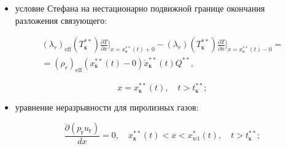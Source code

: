 \begin{itemize}
связующего:

\begin{gather}

\label{kuzn11:eq15}

(\lambda_r)_\text{eff} (T_\text{н}^{\ast \ast})  \frac{\partial T}{\partial x} \Bigr|_{x=x_\text{н}^{\ast \ast} (t)+0} {-}(\lambda_r)_\text{eff} (T_\text{н}^{\ast \ast} ) \frac{\partial T}{\partial x} \Bigr|_{x=x_\text{н}^{\ast \ast} (t)-0} =\rho_r \dot {x}_\text{н}^{\ast \ast} (t)Q^{\ast \ast},\\

\notag

x=x_\text{н}^{\ast \ast} (t),\quad t>t_\text{н}^{\ast \ast};

\end{gather}



\item 

условие Стефана на нестационарно подвижной границе окончания разложения связующего:

\begin{multline}

\label{kuzn11:eq16}

(\lambda _r)_\text{eff} (T_\text{к}^{\ast \ast} ) \frac{\partial T}{\partial x} \Bigr|_{x=x_\text{к}^{\ast \ast} (t)+0} - 

(\lambda _r)(T_\text{к}^{\ast \ast} ) \frac{\partial T}{\partial x} \Bigr|_{x=x_\text{к}^{\ast \ast} (t)-0} =\\=

(\rho_r)_\text{eff} \left( x_\text{к}^{\ast \ast} (t)-0 \right)\dot

{x}_\text{к}^{\ast \ast} (t) Q^{\ast \ast }, 

\end{multline}

$$

x=x_\text{к}^{\ast \ast} (t),\quad t>t_\text{к}^{\ast \ast};

$$



\item

уравнение неразрывности для пиролизных газов:

\begin{equation}

\label{kuzn11:eq17}

\frac{\partial (p_\text{г}  u_\text{г} )}{dx}=0,\quad x_\text{к}^{\ast \ast }

(t) < x < x_{w1}^\ast (t),\quad t>t_\text{к}^{\ast \ast};


\end{equation}
\end{itemize}
